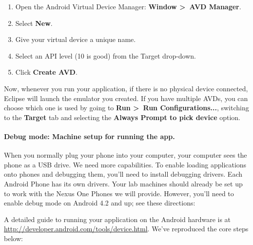 \documentclass[10pt]{article}
\begin{document}
\begin{enumerate}
\item Open the Android Virtual Device Manager: \textbf{Window \textgreater~AVD Manager}.
\item Select \textbf{New}.
\item Give your virtual device a unique name.
\item Select an API level (10 is good) from the Target drop-down.
\item Click \textbf{Create AVD}.
\end{enumerate}

Now, whenever you run your application, if there is no physical device connected, Eclipse will launch the emulator you created. If you have multiple AVDs, you can choose which one is used by going to \textbf{Run \textgreater~Run Configurations...}, switching to the \textbf{Target} tab and selecting the \textbf{Always Prompt to pick device} option.

\paragraph{Debug mode: Machine setup for running the app.}
When you normally plug your phone into your computer, your computer sees the phone as a USB drive. We need more capabilities. To enable loading applications onto phones and debugging them, you'll need to install debugging drivers. Each Android Phone has its own drivers. Your lab machines should already be set up to work with the Nexus One Phones we will provide. However, you'll need to enable debug mode on Android 4.2 and up; see these directions:



A detailed guide to running your application on the Android hardware is at \url{http://developer.android.com/tools/device.html}. We've reproduced the core steps below:
\end{document}
